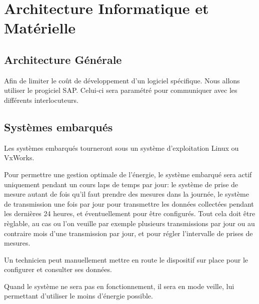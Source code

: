 \section{Architecture Informatique et Matérielle}

\subsection{Architecture Générale}
Afin de limiter le coût de développement d'un logiciel spécifique. 
Nous allons utiliser le progiciel SAP. Celui-ci sera paramétré pour
communiquer avec les différents interlocuteurs. 

\subsection{Systèmes embarqués}

Les systèmes embarqués tourneront sous un système d'exploitation Linux ou VxWorks. 

Pour permettre une gestion optimale de l'énergie, le système embarqué sera actif
uniquement pendant un cours laps de temps par jour: le système de prise de mesure
autant de fois qu'il faut prendre des mesures dans la journée, le système de
transmission une fois par jour pour transmettre les données collectées pendant
les dernières 24 heures, et éventuellement pour être configurés.
Tout cela doit être règlable, au cas ou l'on veuille par exemple plusieurs transmissions
par jour ou au contraire mois d'une transmission par jour, et pour régler l'intervalle de
prises de mesures.

Un technicien peut manuellement mettre en route le dispositif sur place pour
le configurer et consulter ses données.

Quand le système ne sera pas en fonctionnement, il sera en mode veille, lui
permettant d'utiliser le moins d'énergie possible.



